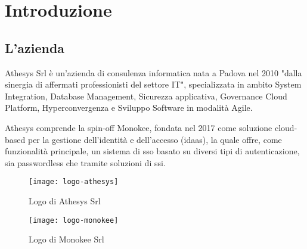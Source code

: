 
\chapter{Introduzione}
\label{cap:introduzione}






\section{L'azienda}

Athesys Srl è un'azienda di consulenza informatica nata a Padova nel 2010 "dalla sinergia di affermati professionisti del settore IT", specializzata in ambito System Integration, Database Management, Sicurezza applicativa, Governance Cloud Platform, Hyperconvergenza e
Sviluppo Software in modalità Agile.

Athesys comprende la spin-off Monokee, fondata nel 2017 come soluzione cloud-based per la gestione dell'identità
e dell'accesso (\acrfull{idaas}), la quale offre, come funzionalità principale, un sistema di \acrfull{sso} basato 
su diversi tipi di autenticazione, sia passwordless che tramite soluzioni di \acrfull{ssi}.

\vspace{20pt}
\begin{figure}[!h] 
    \centering 
    \texttt{[image: logo-athesys]} 
    \caption{Logo di Athesys Srl}
\end{figure}

\begin{figure}[!h] 
    \centering 
    \texttt{[image: logo-monokee]} 
    \caption{Logo di Monokee Srl}
\end{figure}
    

